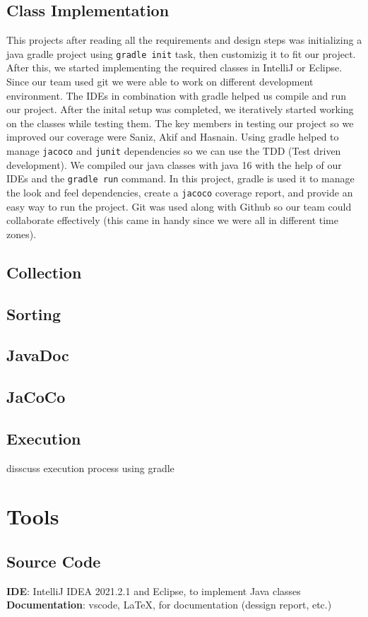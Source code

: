 \documentclass[12pt, dvipsnames, a4paper]{article}
\newcommand{\code}[1]{\texttt{#1}}
\begin{document}
\subsection{Class Implementation}
This projects after reading all the requirements and design steps was initializing a java
gradle project using \code{gradle init} task, then customizig it to fit our project. After this, we started implementing
the required classes in IntelliJ or Eclipse. Since our team used git we were able to work on different development environment.
The IDEs in combination with gradle helped us compile and run our project. After the inital setup was completed, we iteratively
started working on the classes while testing them. The key members in testing our project so we improved our
coverage were Saniz, Akif and Hasnain. Using gradle helped to manage \code{jacoco} and \code{junit} dependencies so we can use
the TDD (Test driven development). We compiled our java classes with java 16 with the help of our IDEs and the \code{gradle run} command.
In this project, gradle is used it to manage the look and feel dependencies, create a \code{jacoco} coverage report, and provide an easy
way to run the project. Git was used along with Github so our team could collaborate effectively (this came in handy since we were all in different
time zones).

\subsection{Collection}
\subsection{Sorting}
\subsection{JavaDoc}
\subsection{JaCoCo}



\subsection{Execution}
disscuss execution process using gradle
\section{Tools}
\subsection{Source Code}
\textbf{IDE}: IntelliJ IDEA 2021.2.1 and Eclipse, to implement Java classes\\
\textbf{Documentation}: vscode, \LaTeX, for documentation (dessign report, etc.)
\end{document}
